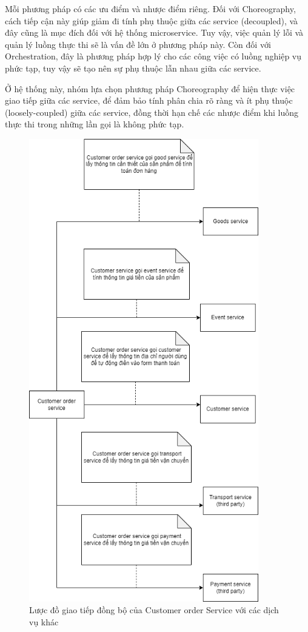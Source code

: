 \par Mỗi phương pháp có các ưu điểm và nhược điểm riêng. Đối với Choreography, cách tiếp cận này giúp giảm đi tính phụ thuộc giữa các service (decoupled), và đây cũng là mục đích đối với hệ thống microservice. Tuy vậy, việc quản lý lỗi và quản lý luồng thực thi sẽ là vấn đề lớn ở phương pháp này. Còn đối với Orchestration, đây là phương pháp hợp lý cho các công việc có luồng nghiệp vụ phức tạp, tuy vậy sẽ tạo nên sự phụ thuộc lẫn nhau giữa các service.

\par Ở hệ thống này, nhóm lựa chọn phương pháp Choreography để hiện thực việc giao tiếp giữa các service, để đảm bảo tính phân chia rõ ràng và ít phụ thuộc (loosely-coupled) giữa các service, đồng thời hạn chế các nhược điểm khi luồng thực thi trong những lần gọi là không phức tạp.

\begin{figure}[!htp]
	\centering
	\includegraphics[width=10cm]{img/Architecture/service/customer-order-call.png}
	\newline
	\caption{Lược đồ giao tiếp đồng bộ của Customer order Service với các dịch vụ khác}
\end{figure}

